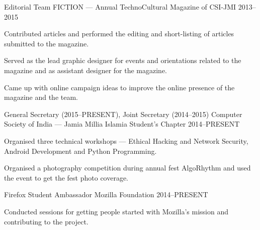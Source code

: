 
\begin{cventries}

\cventry%
  {Editorial Team} %
  {FICTION --- Annual TechnoCultural Magazine of CSI-JMI} %
  {} %
  {2013--2015} %
  {%
    \begin{cvitems} %
      \item{Contributed articles and performed the editing and short-listing of
            articles submitted to the magazine.}
      \item{Served as the lead graphic designer for events and orientations
            related to the magazine and as assistant designer for the magazine.}
      \item{Came up with online campaign ideas to improve the online presence
            of the magazine and the team.}
    \end{cvitems}
  }

\cventry%
  {General Secretary (2015--PRESENT), Joint Secretary (2014--2015)} %
  {Computer Society of India --- Jamia Millia Islamia Student's Chapter} %
  {} %
  {2014--PRESENT} %
  {%
    \begin{cvitems} %
      \item{Organised three technical workshops --- Ethical Hacking and Network
            Security, Android Development and Python Programming.}
      \item{Organised a photography competition during annual fest AlgoRhythm
            and used the event to get the fest photo coverage.}
    \end{cvitems}
  }

\cventry%
  {Firefox Student Ambassador} %
  {Mozilla Foundation} %
  {} %
  {2014--PRESENT} %
  {%
    \begin{cvitems} %
      \item{Conducted sessions for getting people started with Mozilla's mission
            and contributing to the project.}
    \end{cvitems}
  }


\end{cventries}
